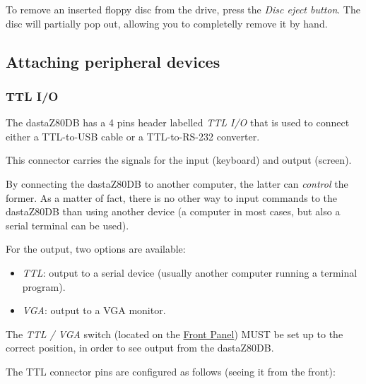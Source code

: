     To remove an inserted floppy disc from the drive, press the
    \textit{Disc eject button}. The disc will partially pop out, allowing you to
    completelly remove it by hand.

    \subsection{Attaching peripheral devices}

        \subsubsection{TTL I/O}

        The dastaZ80DB has a 4 pins header labelled \textit{TTL I/O} that is
        used to connect either a TTL-to-USB cable or a TTL-to-RS-232 converter.

        This connector carries the signals for the input (keyboard) and output
        (screen).

        By connecting the dastaZ80DB to another computer, the latter can
        \textit{control} the former. As a matter of fact, there is no other way
        to input commands to the dastaZ80DB than using another device (a
        computer in most cases, but also a serial terminal can be used).

        For the output, two options are available:

        \begin{itemize}
            \item \textit{TTL}: output to a serial device (usually another
                computer running a terminal program).
            \item \textit{VGA}: output to a VGA monitor.
        \end{itemize}

        The \textit{TTL / VGA} switch (located on the \hyperref[subsec:frontpanel]
        {Front Panel}) MUST be set up to the correct position, in order to see
        output from the dastaZ80DB.

        The TTL connector pins are configured as follows (seeing it from the
        front):

